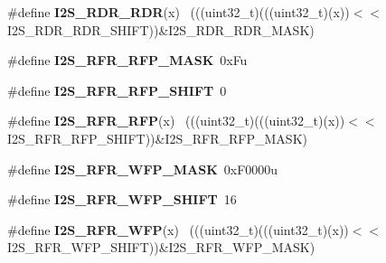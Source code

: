 \begin{DoxyCompactItemize}
\item 
\hypertarget{group___i2_s___register___masks_ga352fd39b9c82693e7bf1ef76ce17befa}{}\#define {\bfseries I2\+S\+\_\+\+R\+D\+R\+\_\+\+R\+D\+R}(x)                                                  ~(((uint32\+\_\+t)(((uint32\+\_\+t)(x))$<$$<$I2\+S\+\_\+\+R\+D\+R\+\_\+\+R\+D\+R\+\_\+\+S\+H\+I\+F\+T))\&I2\+S\+\_\+\+R\+D\+R\+\_\+\+R\+D\+R\+\_\+\+M\+A\+S\+K)\label{group___i2_s___register___masks_ga352fd39b9c82693e7bf1ef76ce17befa}

\item 
\hypertarget{group___i2_s___register___masks_ga47151099035d8d850a3fb194cdb35bb2}{}\#define {\bfseries I2\+S\+\_\+\+R\+F\+R\+\_\+\+R\+F\+P\+\_\+\+M\+A\+S\+K}~0x\+Fu\label{group___i2_s___register___masks_ga47151099035d8d850a3fb194cdb35bb2}

\item 
\hypertarget{group___i2_s___register___masks_ga7ffec4d33d58891c8388e1e85b206f58}{}\#define {\bfseries I2\+S\+\_\+\+R\+F\+R\+\_\+\+R\+F\+P\+\_\+\+S\+H\+I\+F\+T}~0\label{group___i2_s___register___masks_ga7ffec4d33d58891c8388e1e85b206f58}

\item 
\hypertarget{group___i2_s___register___masks_ga12c385c4e121236e4b2e9c2c744ef406}{}\#define {\bfseries I2\+S\+\_\+\+R\+F\+R\+\_\+\+R\+F\+P}(x)                                                  ~(((uint32\+\_\+t)(((uint32\+\_\+t)(x))$<$$<$I2\+S\+\_\+\+R\+F\+R\+\_\+\+R\+F\+P\+\_\+\+S\+H\+I\+F\+T))\&I2\+S\+\_\+\+R\+F\+R\+\_\+\+R\+F\+P\+\_\+\+M\+A\+S\+K)\label{group___i2_s___register___masks_ga12c385c4e121236e4b2e9c2c744ef406}

\item 
\hypertarget{group___i2_s___register___masks_ga14ca8fb387a14c562c2721c054f25acc}{}\#define {\bfseries I2\+S\+\_\+\+R\+F\+R\+\_\+\+W\+F\+P\+\_\+\+M\+A\+S\+K}~0x\+F0000u\label{group___i2_s___register___masks_ga14ca8fb387a14c562c2721c054f25acc}

\item 
\hypertarget{group___i2_s___register___masks_ga1890bc961298234e8516b19b4523bfb5}{}\#define {\bfseries I2\+S\+\_\+\+R\+F\+R\+\_\+\+W\+F\+P\+\_\+\+S\+H\+I\+F\+T}~16\label{group___i2_s___register___masks_ga1890bc961298234e8516b19b4523bfb5}

\item 
\hypertarget{group___i2_s___register___masks_gaeea13d7abeeb75eda8456fd9f33d918a}{}\#define {\bfseries I2\+S\+\_\+\+R\+F\+R\+\_\+\+W\+F\+P}(x)                                                  ~(((uint32\+\_\+t)(((uint32\+\_\+t)(x))$<$$<$I2\+S\+\_\+\+R\+F\+R\+\_\+\+W\+F\+P\+\_\+\+S\+H\+I\+F\+T))\&I2\+S\+\_\+\+R\+F\+R\+\_\+\+W\+F\+P\+\_\+\+M\+A\+S\+K)\label{group___i2_s___register___masks_gaeea13d7abeeb75eda8456fd9f33d918a}


\end{DoxyCompactItemize}

